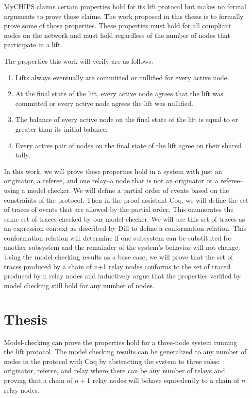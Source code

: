 \documentclass[article, onecolumn, 12pt]{IEEEtran}
\begin{document}
MyCHIPS claims certain properties hold for its lift protocol but makes no formal arguments to prove those claims. The work proposed in this thesis is to formally prove some of those properties. These properties must hold for all compliant nodes on the network and must hold regardless of the number of nodes that participate in a lift. 

The properties this work will verify are as follows:

\begin{enumerate}
\item Lifts always eventually are committed or nullified for every active node. 
\item At the final state of the lift, every active node agrees that the lift was committed or every active node agrees the lift was nullified. 
\item The balance of every active node on the final state of the lift is equal to or greater than its initial balance.
\item Every active pair of nodes on the final state of the lift agree on their shared tally.
\end{enumerate}

In this work, we will prove these properties hold in a system with just an originator, a referee, and one relay--a node that is not an originator or a referee-- using a model checker. We will define a partial order of events based on the constraints of the protocol. Then in the proof assistant Coq, we will define the set of traces of events that are allowed by the partial order. This enumerates the same set of traces checked by our model checker. We will use this set of traces as an expression context as described by Dill \cite{dill_trace_theory} to define a conformation relation. This conformation relation will determine if one subsystem can be substituted for another subsystem and the remainder of the system's behavior will not change.
Using the model checking results as a base case, we will prove that the set of traces produced by a chain of n+1 relay nodes conforms to the set of traced produced by n relay nodes and inductively argue that the properties verified by model checking still hold for any number of nodes.


\section{Thesis}
Model-checking can prove the properties hold for a three-node system running the lift protocol. The model checking results can be generalized to any number of nodes in the protocol with Coq by abstracting the system to three roles: originator, referee, and relay where there can be any number of relays and proving that a chain of $n+1$ relay nodes will behave equivalently to a chain of $n$ relay nodes.
\end{document}
